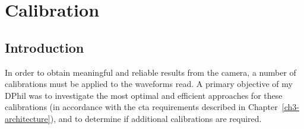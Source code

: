  \chapter{\label{ch5-calibration}Calibration} 

\minitoc




\lstset{language=Python}

\section{Introduction}

In order to obtain meaningful and reliable results from the camera, a number of calibrations must be applied to the waveforms read. A primary objective of my DPhil was to investigate the most optimal and efficient approaches for these calibrations (in accordance with the \gls{cta} requirements described in Chapter~\ref{ch3-architecture}), and to determine if additional calibrations are required.

